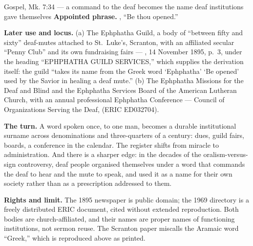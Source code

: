 \begin{afterlife}{Gospel, Mk. 7:34 --- a command to the deaf becomes the name deaf institutions gave themselves}
\textbf{Appointed phrase.} , ``Be thou opened.''

\textbf{Later use and locus.} (a) The Ephphatha Guild, a body of ``between
fifty and sixty'' deaf-mutes attached to St.~Luke's, Scranton, with an
affiliated secular ``Penny Club'' and its own fundraising fairs ---
, 14 November 1895, p.~3, under the heading
``EPHPHATHA GUILD SERVICES,'' which supplies the derivation itself: the guild
``takes its name from the Greek word `Ephphatha' `Be opened' used by the Savior
in healing a deaf mute.'' (b) The Ephphatha Missions for the Deaf and Blind and
the Ephphatha Services Board of the American Lutheran Church, with an annual
professional Ephphatha Conference --- Council of Organizations Serving the
Deaf,  (ERIC ED032704).

\textbf{The turn.} A word spoken once, to one man, becomes a durable
institutional surname across denominations and three-quarters of a century:
dues, guild fairs, boards, a conference in the calendar. The register shifts
from miracle to administration. And there is a sharper edge: in the decades of
the oralism-versus-sign controversy, deaf people organised themselves under a
word that commands the deaf to hear and the mute to speak, and used it as a
name for their own society rather than as a prescription addressed to them.

\textbf{Rights and limit.} The 1895 newspaper is public domain; the 1969
directory is a freely distributed ERIC document, cited without extended
reproduction. Both bodies are church-affiliated, and their names are
proper names of functioning institutions, not sermon reuse. The Scranton
paper miscalls the Aramaic word ``Greek,'' which is reproduced above as
printed.
\end{afterlife}
